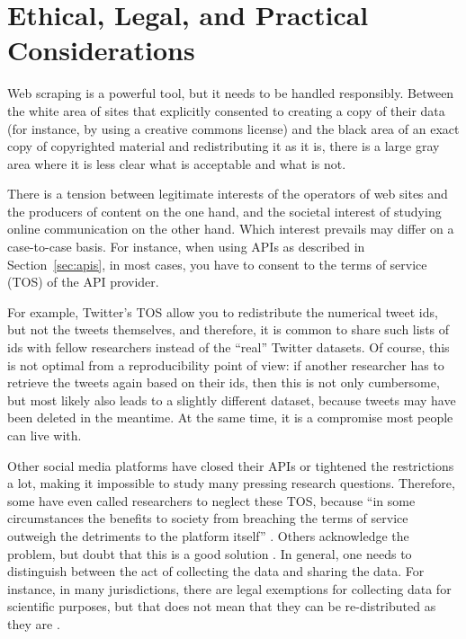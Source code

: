 

%

\section{Ethical, Legal, and Practical Considerations}
\label{sec:ethicallegalpractical}
Web scraping is a powerful tool, but it needs to be handled
responsibly. Between the white area of sites that explicitly consented
to creating a copy of their data (for instance, by using a creative
commons license) and the black area of an exact copy of copyrighted
material and redistributing it as it is, there is a large gray area
where it is less clear what is acceptable and what is not.

There is a tension between legitimate interests of the operators of
web sites and the producers of content on the one hand, and the
societal interest of studying online communication on the other
hand. Which interest prevails may differ on a case-to-case basis. For
instance, when using APIs as described in Section~\ref{sec:apis}, in most
cases, you have to consent to the terms of service (TOS) of the API
provider.

For example, Twitter's TOS allow you to redistribute the numerical
tweet ids, but not the tweets themselves, and therefore, it is common
to share such lists of ids with fellow researchers instead of the
``real'' Twitter datasets. Of course, this is not optimal from a
reproducibility point of view: if another researcher has to retrieve
the tweets again based on their ids, then this is not only cumbersome,
but most likely also leads to a slightly different dataset, because
tweets may have been deleted in the meantime. At the same time, it is
a compromise most people can live with.

Other social media platforms have closed their APIs or tightened the
restrictions a lot, making it impossible to study many pressing
research questions. Therefore, some have even called researchers to
neglect these TOS, because ``in some circumstances the benefits to
society from breaching the terms of service outweigh the detriments to
the platform itself'' \citep[p.~1561]{Bruns2019}. Others acknowledge
the problem, but doubt that this is a good solution
\citep{Puschmann2019}.
In general, one needs to distinguish between the act of collecting the
data and sharing the data. For instance, in many jurisdictions, there
are legal exemptions for collecting data for scientific purposes, but
that does not mean that they can be re-distributed as they are
\citep{VanAtteveldt2019}.

